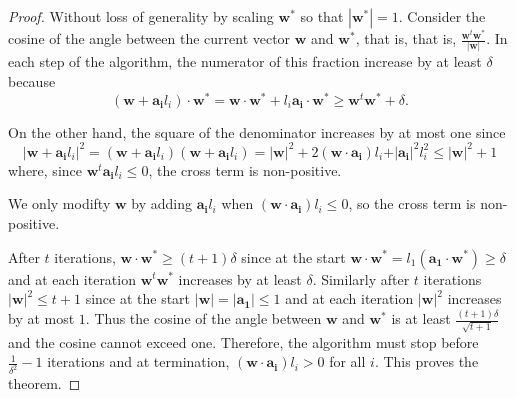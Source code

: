 \begin{proof}
    Without loss of generality by scaling \(\mathbf{w} ^*\) so that \(\left\vert \mathbf{w} ^* \right\vert = 1 \). Consider the cosine of the angle between the current vector \(\mathbf{w} \) and \(\mathbf{w} ^*\), that is, that is, \(\frac{\mathbf{w} ^t \mathbf{w} ^*}{\vert \mathbf{w}  \vert }\). In each step of the algorithm, the numerator of this fraction increase by at least \(\delta \) because 
    \[
        \left( \mathbf{w} + \mathbf{a_i} l_i \right) \cdot \mathbf{w} ^* = \mathbf{w} \cdot \mathbf{w} ^* + l_i \mathbf{a_i} \cdot \mathbf{w} ^* \ge \mathbf{w} ^t \mathbf{w} ^* + \delta .
    \]   
    
    On the other hand, the square of the denominator increases by at most one since 
    \[
        \left\vert \mathbf{w} + \mathbf{a_i} l_i  \right\vert^2 = \left( \mathbf{w} + \mathbf{a_i} l_i  \right) \left( \mathbf{w} + \mathbf{a_i} l_i \right) = \vert \mathbf{w}  \vert^2 + 2 \left( \mathbf{w}  \cdot \mathbf{a_i}  \right) l_i + \vert \mathbf{a_i}  \vert^2 l_i^2 \le \vert \mathbf{w}  \vert^2 + 1       
    \]
    where, since \(\mathbf{w}^t \mathbf{a_i} l_i \le 0  \), the cross term is non-positive.
    
    \begin{note}
        We only modifty \(\mathbf{w} \) by adding \(\mathbf{a_i} l_i \)  when \((\mathbf{w}  \cdot \mathbf{a_i} )l_i \le 0\), so the cross term is non-positive.
    \end{note}

    After \(t\) iterations, \(\mathbf{w} \cdot \mathbf{w} ^* \ge (t+1) \delta \) since at the start \(\mathbf{w} \cdot \mathbf{w} ^* = l_1 \left( \mathbf{a_1} \cdot \mathbf{w} ^* \right) \ge \delta  \) and at each iteration \(\mathbf{w} ^t \mathbf{w} ^*\) increases by at least \(\delta \). Similarly after \(t\) iterations \(\vert \mathbf{w}  \vert^2 \le t + 1 \) since at the start \(\vert \mathbf{w}  \vert = \vert \mathbf{a_1}  \vert \le 1 \) and at each iteration \(\vert \mathbf{w}  \vert^2 \) increases by at most \(1\). Thus the cosine of the angle between \(\mathbf{w} \) and \(\mathbf{w} ^*\) is at least \(\frac{(t+1) \delta }{\sqrt{t+1} }\) and the cosine cannot exceed one. Therefore, the algorithm must stop before \(\frac{1}{\delta ^2}-1\) iterations and at termination, \(\left( \mathbf{w} \cdot \mathbf{a_i}  \right) l_i > 0 \) for all \(i\). This proves the theorem.                
\end{proof}

